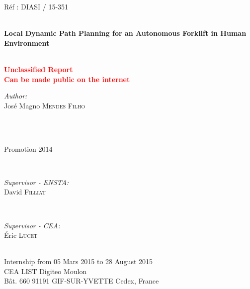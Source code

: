 \begin{titlepage}
{Réf : DIASI / 15-351 \hfill}

\HRule \\[0.2cm]
\Huge \textbf{Local Dynamic Path Planning for an Autonomous Forklift in Human Environment}\\[-0.2cm] %
\HRule \\[0.5cm]

\begin{center}
\textbf{\textcolor{red}{\Large{
Unclassified Report}\\[-0.4cm]%
\large{Can be made public on the internet}
}}
\end{center}

\begin{minipage}{0.55\textwidth}
\begin{flushleft} \Large
\emph{Author:}\\
José Magno \textsc{Mendes Filho} \\[0.7cm] %
\end{flushleft}
\end{minipage}
~
\begin{minipage}{0.35\textwidth}
\begin{flushright} \Large
\mbox{}\\[0.4cm]
Promotion 2014
\end{flushright}
\end{minipage}\\[1.0cm]

\begin{minipage}{0.45\textwidth}
\begin{flushleft} \large
\emph{Supervisor - ENSTA:}\\
David \textsc{Filliat} %
\end{flushleft}
\end{minipage}
~
\begin{minipage}{0.45\textwidth}
\begin{flushright} \large
\emph{Supervisor - CEA:} \\
Éric \textsc{Lucet} %
\end{flushright}
\end{minipage}\\[1.0cm]

\large{Internship from 05 Mars 2015 to 28 August 2015}\\[0.6cm]
\large{CEA LIST Digiteo Moulon\\ Bât. 660 91191 GIF-SUR-YVETTE Cedex, France}

\end{titlepage}


